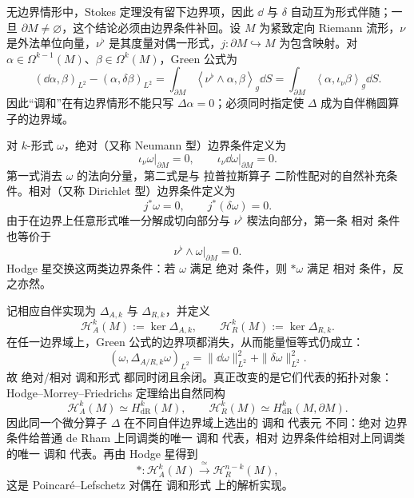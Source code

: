 无边界情形中，Stokes 定理没有留下边界项，因此 $\dd$ 与 $\delta$ 自动互为形式伴随；一旦 $\partial M\neq\varnothing$，这个结论必须由边界条件补回。设 $M$ 为紧致定向 Riemann 流形，$\nu$ 是外法单位向量，$\nu^\flat$ 是其度量对偶一形式，$j:\partial M\hookrightarrow M$ 为包含映射。对 $\alpha\in\Omega^{k-1}(M)$、$\beta\in\Omega^k(M)$，Green 公式为
\begin{equation}\label{eq:math-dg-hodge-green-boundary}
 (\dd\alpha,\beta)_{L^2}-(\alpha,\delta\beta)_{L^2}
 =\int_{\partial M}
 \left\langle \nu^\flat\wedge\alpha,\beta\right\rangle_g\dd S
 =\int_{\partial M}
 \left\langle \alpha,\iota_{\nu}\beta\right\rangle_g\dd S.
\end{equation}
因此“调和”在有边界情形不能只写 $\Delta\alpha=0$；必须同时指定使 $\Delta$ 成为自伴椭圆算子的边界域。

对 $k$-形式 $\omega$，绝对（又称 Neumann 型）边界条件定义为
\begin{equation*}\boxed{
 \iota_{\nu}\omega\big|_{\partial M}=0,
 \qquad
 \iota_{\nu}\dd\omega\big|_{\partial M}=0.}
\end{equation*}
第一式消去 $\omega$ 的法向分量，第二式是与 拉普拉斯算子 二阶性配对的自然补充条件。相对（又称 Dirichlet 型）边界条件定义为
\begin{equation*}\boxed{
 j^*\omega=0,
 \qquad
 j^*(\delta\omega)=0.}
\end{equation*}
由于在边界上任意形式唯一分解成切向部分与 $\nu^\flat$ 楔法向部分，第一条 相对 条件也等价于
\[
 \nu^\flat\wedge\omega\big|_{\partial M}=0.
\]
Hodge 星交换这两类边界条件：若 $\omega$ 满足 绝对 条件，则 $*\omega$ 满足 相对 条件，反之亦然。

记相应自伴实现为 $\Delta_{A,k}$ 与 $\Delta_{R,k}$，并定义
\begin{equation*}\mathcal H_A^k(M):=\ker\Delta_{A,k},
 \qquad
 \mathcal H_R^k(M):=\ker\Delta_{R,k}.
\end{equation*}
在任一边界域上，Green 公式的边界项都消失，从而能量恒等式仍成立：
\begin{equation}\label{eq:math-dg-boundary-hodge-energy}
 (\omega,\Delta_{A/R,k}\omega)_{L^2}
 =\|\dd\omega\|_{L^2}^2+\|\delta\omega\|_{L^2}^2.
\end{equation}
故 绝对/相对 调和形式 都同时闭且余闭。真正改变的是它们代表的拓扑对象：Hodge--Morrey--Friedrichs 定理给出自然同构
\begin{equation*}\boxed{
 \mathcal H_A^k(M)\simeq H_{\mathrm{dR}}^k(M),
 \qquad
 \mathcal H_R^k(M)\simeq H_{\mathrm{dR}}^k(M,\partial M).}
\end{equation*}
因此同一个微分算子 $\Delta$ 在不同自伴边界域上选出的 调和 代表元 不同：绝对 边界条件给普通 de Rham 上同调类的唯一 调和 代表，相对 边界条件给相对上同调类的唯一 调和 代表。再由 Hodge 星得到
\begin{equation}\label{eq:math-dg-poincare-lefschetz-hodge}
 *:\mathcal H_A^k(M)\xrightarrow{\ \simeq\ }
 \mathcal H_R^{n-k}(M),
\end{equation}
这是 Poincar\'e--Lefschetz 对偶在 调和形式 上的解析实现。


